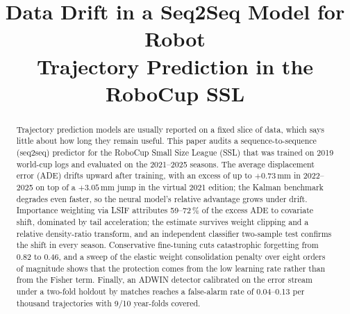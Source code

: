 \documentclass[conference]{IEEEtran}
\newif\ifmarkchanges
\newcommand{\chg}[1]{\ifmarkchanges\hl{#1}\else#1\fi}
\begin{document}
\title{Data Drift in a Seq2Seq Model for Robot\\Trajectory Prediction in the RoboCup SSL}

\author{
}
%

\maketitle

\begin{abstract}
\chg{Trajectory prediction models are usually reported on a fixed slice of data,
which says little about how long they remain useful. This paper audits a
sequence-to-sequence (seq2seq) predictor for the RoboCup Small Size League
(SSL) that was trained on 2019 world-cup logs and evaluated on the 2021--2025
seasons. The average displacement error (ADE) drifts upward after training,
with an excess of up to \mbox{$+0.73$}\,mm in 2022--2025 on top of a
\mbox{$+3.05$}\,mm jump in the virtual 2021 edition; the Kalman benchmark
degrades even faster, so the neural model's relative advantage grows under
drift. Importance weighting via LSIF attributes 59--72\,\% of the excess ADE to
covariate shift, dominated by tail acceleration; the estimate survives weight
clipping and a relative density-ratio transform, and an independent classifier
two-sample test confirms the shift in every season. Conservative fine-tuning
cuts catastrophic forgetting from 0.82 to 0.46, and a sweep of the elastic
weight consolidation penalty over eight orders of magnitude shows that the
protection comes from the low learning rate rather than from the Fisher term.
Finally, an ADWIN detector calibrated on the error stream under a two-fold
holdout by matches reaches a false-alarm rate of 0.04--0.13 per thousand
trajectories with 9/10 year-folds covered.}
\end{abstract}
\end{document}
